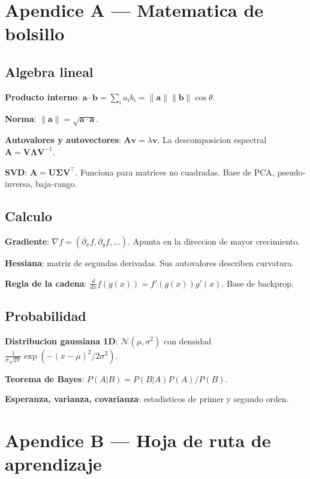 \documentclass[11pt,a4paper,twoside,openright]{book}
\begin{document}
\backmatter

\chapter{Apendice A --- Matematica de bolsillo}

\section{Algebra lineal}

\textbf{Producto interno}: $\mathbf{a} \cdot \mathbf{b} = \sum_i a_i b_i = \|\mathbf{a}\| \|\mathbf{b}\| \cos\theta$.

\textbf{Norma}: $\|\mathbf{a}\| = \sqrt{\mathbf{a} \cdot \mathbf{a}}$.

\textbf{Autovalores y autovectores}: $\mathbf{A}\mathbf{v} = \lambda \mathbf{v}$. La descomposicion espectral $\mathbf{A} = \mathbf{V}\boldsymbol{\Lambda}\mathbf{V}^{-1}$.

\textbf{SVD}: $\mathbf{A} = \mathbf{U}\boldsymbol{\Sigma}\mathbf{V}^\top$. Funciona para matrices no cuadradas. Base de PCA, pseudo-inversa, baja-rango.

\section{Calculo}

\textbf{Gradiente}: $\nabla f = (\partial_x f, \partial_y f, \dots)$. Apunta en la direccion de mayor crecimiento.

\textbf{Hessiana}: matriz de segundas derivadas. Sus autovalores describen curvatura.

\textbf{Regla de la cadena}: $\frac{d}{dx} f(g(x)) = f'(g(x)) g'(x)$. Base de backprop.

\section{Probabilidad}

\textbf{Distribucion gaussiana 1D}: $\mathcal{N}(\mu, \sigma^2)$ con densidad $\frac{1}{\sigma\sqrt{2\pi}} \exp(-(x-\mu)^2/2\sigma^2)$.

\textbf{Teorema de Bayes}: $P(A|B) = P(B|A)P(A)/P(B)$.

\textbf{Esperanza, varianza, covarianza}: estadisticos de primer y segundo orden.

\chapter{Apendice B --- Hoja de ruta de aprendizaje}
\end{document}
